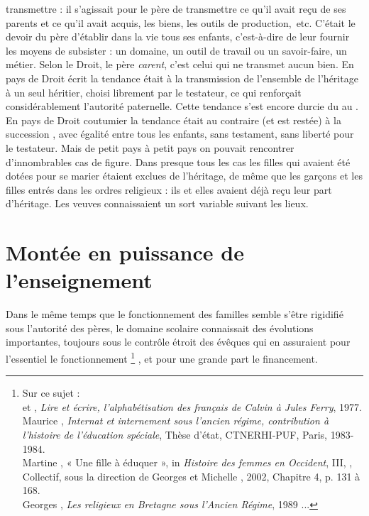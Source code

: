 \begin{enumerate}
transmettre : il s'agissait pour le père de transmettre ce qu'il avait reçu de ses parents et ce qu'il avait acquis, les biens, les outils de production,~etc. C'était le devoir du père d'établir dans la vie tous ses enfants, c'est-à-dire de leur fournir les moyens de subsister : un domaine, un outil de travail ou un savoir-faire, un métier. Selon le Droit, le père \emph{carent}, c'est celui qui ne transmet aucun bien. En pays de Droit écrit la tendance était à la transmission de l'ensemble de l'héritage à un seul héritier, choisi librement par le testateur, ce qui renforçait considérablement l'autorité paternelle. Cette tendance s'est encore durcie du  au . En pays de Droit coutumier la tendance était au contraire (et est restée) à la succession , avec égalité entre tous les enfants, sans testament, sans liberté pour le testateur. Mais de petit pays à petit pays on pouvait rencontrer d'innombrables cas de figure. Dans presque tous les cas les filles qui avaient été dotées pour se marier étaient exclues de l'héritage, de même que les garçons et les filles entrés dans les ordres religieux : ils et elles avaient déjà reçu leur part d'héritage. Les veuves connaissaient un sort variable suivant les lieux. 
\end{enumerate}

\section{Montée en puissance de l'enseignement}

Dans le même temps que le fonctionnement des familles semble s'être rigidifié sous l'autorité des pères, le domaine scolaire connaissait des évolutions importantes, toujours sous le contrôle étroit des évêques qui en assuraient pour l'essentiel le fonctionnement
\footnote{Sur ce sujet :
\\ et , \emph{Lire et écrire, l'alphabétisation des français de Calvin à Jules Ferry}, 1977.
\\Maurice {}, \emph{Internat et internement sous l'ancien régime, contribution à l'histoire de l'éducation spéciale}, Thèse d'état, CTNERHI-PUF, Paris, 1983-1984.
\\Martine {}, {« Une fille à éduquer », in \emph{Histoire des femmes en Occident}, III, }, Collectif, sous la direction de Georges  et Michelle , 2002, Chapitre 4, p. 131 à 168.
\\Georges {}, \emph{Les religieux en Bretagne sous l'Ancien Régime}, 1989 ...}%
, et pour une grande part le financement.

